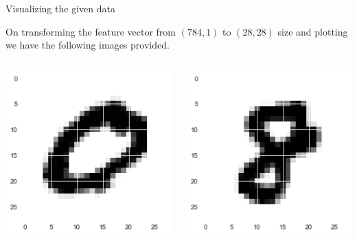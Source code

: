 \documentclass[12pt,t]{beamer}
\begin{document}
\begin{frame}[t]{Visualizing the given data}

    \scriptsize

    On transforming the feature vector from $(784,1)$ to $(28,28)$ size and plotting we
    have the following images provided.

    \vspace{10pt}

    \begin{columns}
        \begin{column}[]{0.3\linewidth}
            \includegraphics[width=\linewidth]{visualize_data/fig_0.png}
        \end{column}
        \begin{column}[]{0.3\linewidth}
            \includegraphics[width=\linewidth]{visualize_data/fig_8.png}

\end{column}
\end{columns}
\end{frame}
\end{document}
